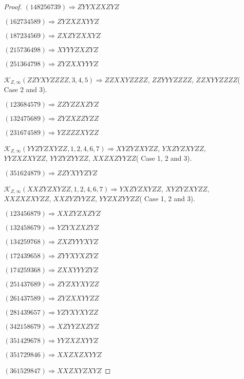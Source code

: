 \documentclass[12pt]{article}
\theoremstyle{plain}
\theoremstyle{definition}
\theoremstyle{remark}
\newcommand{\fancy}[1]{\mathcal{#1}}
\def\K{\fancy{K}}
\begin{document}
\begin{proof}
	
	
	$(1 4 8 2 5 6 7 3 9)\Rightarrow ZYYXZXZYZ$
	
	$(1 6 2 7 3 4 5 8 9)\Rightarrow ZYZXZXYYZ$
	
	$(1 8 7 2 3 4 5 6 9)\Rightarrow ZXZYZXXYZ$
	
	$(2 1 5 7 3 6 4 9 8)\Rightarrow XYYYZXZYZ$
	
	$(2 5 1 3 6 4 7 9 8)\Rightarrow ZYZXXYYYZ$
	
	
	
	$\K_{Z,\infty}(ZZYXYZZZZ,3, 4, 5)\Rightarrow $$ZZXXYZZZZ$, $ZZYYYZZZZ$, $ZZXYYZZZZ$( Case 2 and 3).
	
	
	
	$(1 2 3 6 8 4 5 7 9)\Rightarrow ZZYZZXZYZ$
	
	$(1 3 2 4 7 5 6 8 9)\Rightarrow ZYZXZZYZZ$
	
	$(2 3 1 6 7 4 5 8 9)\Rightarrow YZZZZXYZZ$
	
	
	
	$\K_{Z,\infty}(YYZYZXYZZ,1, 2, 4, 6, 7)\Rightarrow $$XYZYZXYZZ$, $YXZYZXYZZ$, $YYZXZXYZZ$, $YYZYZYYZZ$, $XXZXZYYZZ$( Case 1, 2 and 3).
	
	
	
	$(3 5 1 6 2 4 8 7 9)\Rightarrow ZZYXYYZYZ$
	
	
	
	$\K_{Z,\infty}(XXZYZXYZZ,1, 2, 4, 6, 7)\Rightarrow $$YXZYZXYZZ$, $XYZYZXYZZ$, $XXZXZXYZZ$, $XXZYZYYZZ$, $YYZXZYYZZ$( Case 1, 2 and 3).
	
	
	
	$(1 2 3 4 5 6 8 7 9)\Rightarrow XXZYZXZYZ$
	
	$(1 3 2 4 5 8 6 7 9)\Rightarrow YZYXZXZYZ$
	
	$(1 3 4 2 5 9 7 6 8)\Rightarrow ZXZYYYXYZ$
	
	$(1 7 2 4 3 9 6 5 8)\Rightarrow ZYYXYXZYZ$
	
	$(1 7 4 2 5 9 3 6 8)\Rightarrow ZXXYYYZYZ$
	
	$(2 5 1 4 3 7 6 8 9)\Rightarrow ZYZXYXYZZ$
	
	$(2 6 1 4 3 7 5 8 9)\Rightarrow ZYZXXYYZZ$
	
	$(2 8 1 4 3 9 6 5 7)\Rightarrow YZYXYXYZZ$
	
	$(3 4 2 1 5 8 6 7 9)\Rightarrow XZYYZXZYZ$
	
	$(3 5 1 4 2 9 6 7 8)\Rightarrow YYZXZXYYZ$
	
	$(3 5 1 7 2 9 8 4 6)\Rightarrow XXZXZXYYZ$
	
	$(3 6 1 5 2 9 8 4 7)\Rightarrow XXZXYZXYZ$
	

\end{proof}
\end{document}
